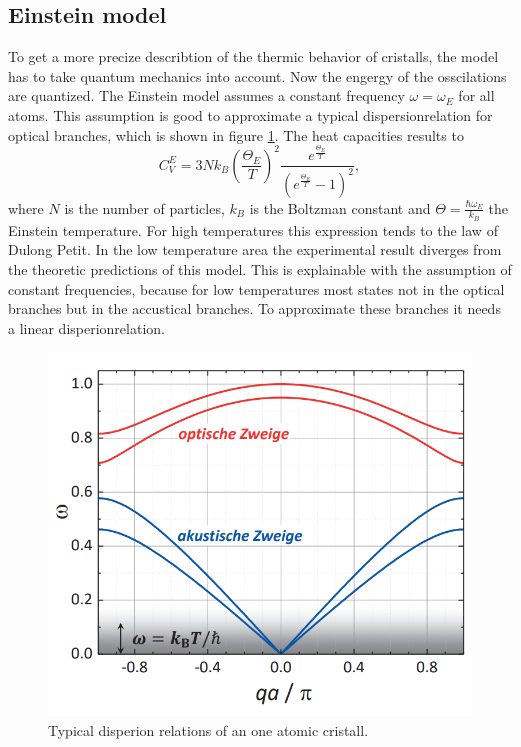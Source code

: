 \subsection{Einstein model}

To get a more precize describtion of the thermic behavior of cristalls, the model has to take quantum mechanics into account. 
Now the engergy of the osscilations are quantized.
The Einstein model assumes a constant frequency $\omega = \omega_E$ for all atoms.
This assumption is good to approximate a typical dispersionrelation for optical branches, which is shown in figure \ref{fig:disperion}. 
The heat capacities results to 
\begin{equation}
    C_V^E = 3 N k_B\left(\frac{\Theta_E}{T}\right)^2\frac{e^{\frac{\Theta_E}{T}}}{\left(e^\frac{\Theta_E}{T}-1\right)^2},
\end{equation}
where $N$ is the number of particles, $k_B$ is the Boltzman constant and $\Theta=\frac{\hbar \omega_E}{k_B}$ the Einstein temperature.
For high temperatures this expression tends to the law of Dulong Petit.
In the low temperature area the experimental result diverges from the theoretic predictions of this model.
This is explainable with the assumption of constant frequencies, because for low temperatures most states not in the optical branches but in the accustical branches.
To approximate these branches it needs a linear disperionrelation.

\begin{figure}
    \centering 
    \includegraphics[width=.8\textwidth]{Bilder/disperion.PNG}
    \caption{Typical disperion relations of an one atomic cristall.}
    \label{fig:disperion}
\end{figure}


